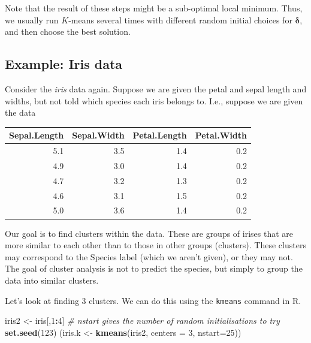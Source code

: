 \documentclass[
]{book}
\newenvironment{Shaded}{\begin{snugshade}}{\end{snugshade}}
\newcommand{\AttributeTok}[1]{\textcolor[rgb]{0.13,0.29,0.53}{#1}}
\newcommand{\CommentTok}[1]{\textcolor[rgb]{0.56,0.35,0.01}{\textit{#1}}}
\newcommand{\DecValTok}[1]{\textcolor[rgb]{0.00,0.00,0.81}{#1}}
\newcommand{\FunctionTok}[1]{\textcolor[rgb]{0.13,0.29,0.53}{\textbf{#1}}}
\newcommand{\NormalTok}[1]{#1}
\newcommand{\OtherTok}[1]{\textcolor[rgb]{0.56,0.35,0.01}{#1}}
\newcommand{\SpecialCharTok}[1]{\textcolor[rgb]{0.81,0.36,0.00}{\textbf{#1}}}
\theoremstyle{definition}
\theoremstyle{definition}
\theoremstyle{definition}
\theoremstyle{definition}
\theoremstyle{remark}
\begin{document}
Note that the result of these steps might be a sub-optimal local minimum. Thus, we usually run \(K\)-means several times with different random initial choices for \(\boldsymbol \delta\), and then choose the best solution.

\hypertarget{example-iris-data}{%
\subsection{Example: Iris data}\label{example-iris-data}}

Consider the \emph{iris} data again. Suppose we are given the petal and sepal length and widths, but not told which species each iris belongs to. I.e., suppose we are given the data

\begin{table}
\centering
\begin{tabular}{rrrr}
\toprule
Sepal.Length & Sepal.Width & Petal.Length & Petal.Width\\
\midrule
5.1 & 3.5 & 1.4 & 0.2\\
4.9 & 3.0 & 1.4 & 0.2\\
4.7 & 3.2 & 1.3 & 0.2\\
4.6 & 3.1 & 1.5 & 0.2\\
5.0 & 3.6 & 1.4 & 0.2\\
\bottomrule
\end{tabular}
\end{table}

Our goal is to find clusters within the data. These are groups of irises that are more similar to each other than to those in other groups (clusters). These clusters may correspond to the Species label (which we aren't given), or they may not. The goal of cluster analysis is not to predict the species, but simply to group the data into similar clusters.

Let's look at finding 3 clusters. We can do this using the \texttt{kmeans} command in R.

\begin{Shaded}
\begin{Highlighting}[]
\NormalTok{iris2 }\OtherTok{\textless{}{-}}\NormalTok{ iris[,}\DecValTok{1}\SpecialCharTok{:}\DecValTok{4}\NormalTok{]}
\CommentTok{\# nstart gives the number of random initialisations to try }
\FunctionTok{set.seed}\NormalTok{(}\DecValTok{123}\NormalTok{)}
\NormalTok{(iris.k }\OtherTok{\textless{}{-}} \FunctionTok{kmeans}\NormalTok{(iris2, }\AttributeTok{centers =} \DecValTok{3}\NormalTok{, }\AttributeTok{nstart=}\DecValTok{25}\NormalTok{)) }
\end{Highlighting}
\end{Shaded}
\end{document}
